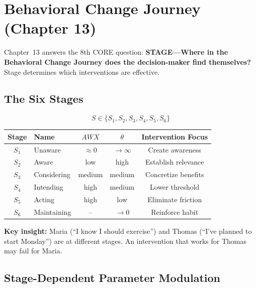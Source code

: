 \section{Behavioral Change Journey (Chapter 13)}
\label{sec:mp-bcj}

Chapter~13 answers the 8th CORE question: \textbf{STAGE---Where in the Behavioral Change Journey does the decision-maker find themselves?} Stage determines which interventions are effective.

\subsection{The Six Stages}

\begin{equation}
\boxed{
S \in \{S_1, S_2, S_3, S_4, S_5, S_6\}
}
\label{eq:mp-bcj-stages}
\end{equation}

\begin{center}
\renewcommand{\arraystretch}{1.2}
\small
\begin{tabular}{@{}clccc@{}}
\toprule
\textbf{Stage} & \textbf{Name} & $AWX$ & $\theta$ & \textbf{Intervention Focus} \\
\midrule
$S_1$ & Unaware & $\approx 0$ & $\to \infty$ & Create awareness \\
$S_2$ & Aware & low & high & Establish relevance \\
$S_3$ & Considering & medium & medium & Concretize benefits \\
$S_4$ & Intending & high & medium & Lower threshold \\
$S_5$ & Acting & high & low & Eliminate friction \\
$S_6$ & Maintaining & -- & $\to 0$ & Reinforce habit \\
\bottomrule
\end{tabular}
\end{center}

\textbf{Key insight:} Maria (``I know I should exercise'') and Thomas (``I've planned to start Monday'') are at different stages. An intervention that works for Thomas may fail for Maria.

\subsection{Stage-Dependent Parameter Modulation}

